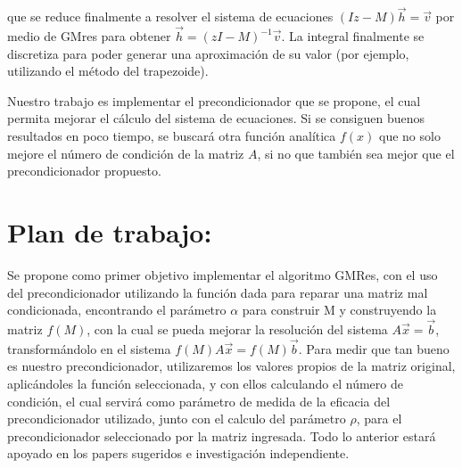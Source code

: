 \documentclass[fleqn]{article}
\begin{document}
que se reduce finalmente a resolver el sistema de ecuaciones $(Iz - M)\vec{h} = \vec{v}$ por medio de GMres para obtener $\vec{h} = (zI - M)^{-1}\vec{v}$. La integral finalmente se discretiza para poder generar una aproximación de su valor (por ejemplo, utilizando el método del trapezoide).

Nuestro trabajo es implementar el precondicionador que se propone, el cual permita mejorar el cálculo del sistema de ecuaciones. Si se consiguen buenos resultados en poco tiempo, se buscará otra función analítica $f(x)$ que no solo mejore el número de condición de la matriz $A$, si no que también sea mejor que el precondicionador propuesto.


\section{Plan de trabajo:}

Se propone como primer objetivo implementar el algoritmo GMRes, con el uso del precondicionador utilizando la función dada para reparar una matriz mal condicionada, encontrando el parámetro $\alpha$ para construir M y construyendo la matriz $f(M)$, con la cual se pueda mejorar la resolución del sistema $A\vec{x} = \vec{b}$, transformándolo en el sistema $f(M)A\vec{x} = f(M)\vec{b}$. Para medir que tan bueno es nuestro precondicionador, utilizaremos los valores propios de la matriz original, aplicándoles la función seleccionada, y con ellos calculando el número de condición, el cual servirá como parámetro de medida de la eficacia del precondicionador utilizado, junto con el calculo del parámetro $\rho$, para el precondicionador seleccionado por la matriz ingresada. Todo lo anterior estará apoyado en los papers sugeridos e investigación independiente. 
\end{document}
